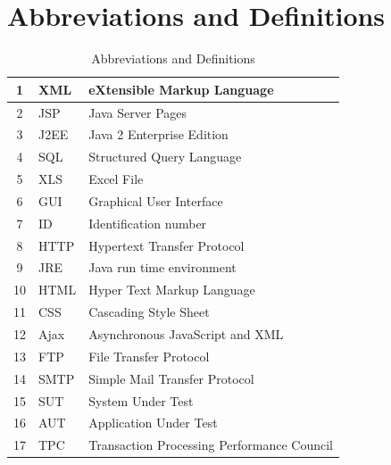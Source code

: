 \documentclass[12pt]{book}
\begin{document}

\section{Abbreviations and Definitions}
 \begin{table}[h]
  \begin{center}
   \begin{tabular}{|c|l|p{8cm}|} 
    \hline
    1 & XML & eXtensible Markup Language\\
    \hline
    2 & JSP & Java Server Pages\\
    \hline
    3 & J2EE & Java 2 Enterprise Edition\\
    \hline
    4 & SQL & Structured Query Language\\
    \hline
    5 & XLS & Excel File\\
    \hline
    6 & GUI & Graphical User Interface\\    
    \hline
    7 & ID & Identification number \\
    \hline
    8 & HTTP & Hypertext Transfer Protocol\\
    \hline
    9 & JRE & Java run time environment\\
    \hline
    10 & HTML & Hyper Text Markup Language\\
    \hline
    11 & CSS & Cascading Style Sheet\\
    \hline
    12 & Ajax & Asynchronous JavaScript and XML\\
    \hline
    13 & FTP & File Transfer Protocol\\
    \hline
    14 & SMTP & Simple Mail Transfer Protocol\\
    \hline
    15 & SUT & System Under Test\\
    \hline
    16 & AUT & Application Under Test\\
    \hline
    17 & TPC & Transaction Processing Performance Council\\
    \hline
   \end{tabular}

   \caption{Abbreviations and Definitions}
  \end{center}

 \end{table}
\end{document}
